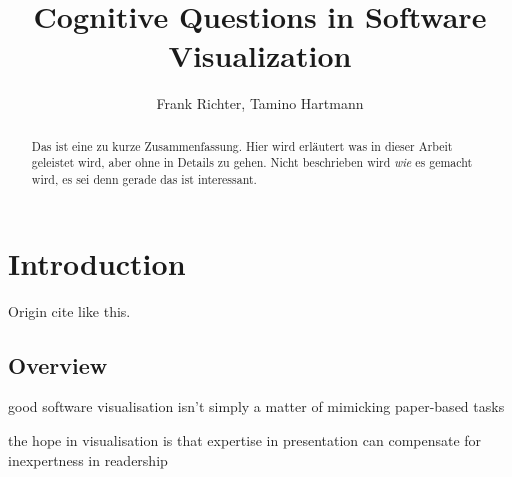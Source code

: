 \documentclass[11pt, a4paper, ngerman, twoside]{article}
\date{}
\theoremstyle{plain}\newtheorem{Lemma}{Lemma}
\theoremstyle{plain}\newtheorem{Satz}[Lemma]{Satz}
\theoremstyle{definition}\newtheorem{Definition}[Lemma]{Definition}
\theoremstyle{definition}\newtheorem*{Beispiel}{Beispiel}
\theoremstyle{remark}\newtheorem*{Bemerkung}{Bemerkung}
\begin{document}
\title{Cognitive Questions in Software Visualization}
\author{Frank Richter, Tamino Hartmann}

\makeatletter
\let\mytitle\@title
\let\myauthor\@author
\makeatother
\maketitle
\begin{abstract}

Das ist eine zu kurze Zusammenfassung.
Hier wird erläutert was in dieser Arbeit geleistet wird, aber ohne in Details zu gehen.
Nicht beschrieben wird \textit{wie} es gemacht wird, es sei denn gerade das ist interessant.

\end{abstract}

\section{Introduction}

Origin cite like this\cite{origin}.

\subsection{Overview}

good software visualisation isn’t simply a matter of mimicking paper-based tasks

the hope in visualisation is that expertise in presentation can compensate for inexpertness in readership
\end{document}
